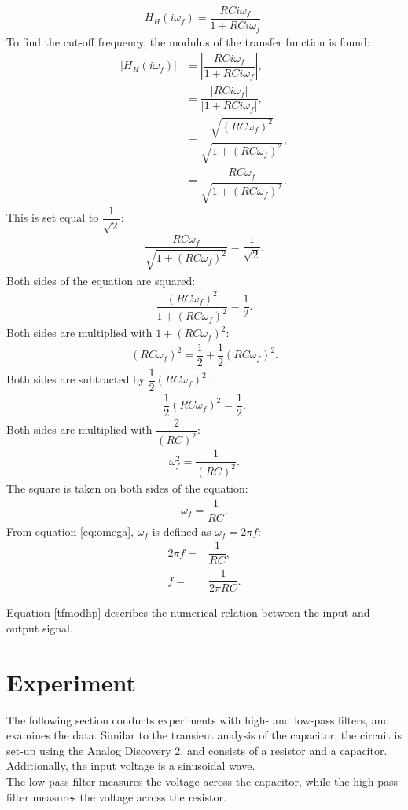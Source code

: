 \begin{align*}
H_{H}(i \omega_f) = \dfrac{RCi \omega_f}{1 + RCi \omega_f}.
\end{align*}
To find the cut-off frequency, the modulus of the transfer function is found:
\begin{align}
\left|H_{H}(i \omega_f)\right| &= \left|\dfrac{RCi \omega_f}{1 + RCi \omega_f} \right|, \nonumber \\
 &= \dfrac{|RCi \omega_f|}{|1 + RCi \omega_f |}, \nonumber \\
 &= \dfrac{\sqrt{(RC \omega_f)^2}}{\sqrt{1 + (RC \omega_f)^2 }}, \nonumber \\
 &= \dfrac{RC \omega_f}{\sqrt{1 + (RC \omega_f)^2 }}. \label{tfmodhp}
\end{align} 
This is set equal to $\dfrac{1}{\sqrt{2}}$:
\begin{align*}
\dfrac{RC \omega_f}{\sqrt{1 + (RC \omega_f)^2 }}=\dfrac{1}{\sqrt{2}}.
\end{align*}
Both sides of the equation are squared:
\begin{align*}
\dfrac{(RC \omega_f)^2}{1 + (RC \omega_f)^2 }=\dfrac{1}{2}.
\end{align*}
Both sides are multiplied with $1+(RC\omega_f)^2$:
\begin{align*}
(RC \omega_f)^2 =\dfrac{1}{2}+\dfrac{1}{2}(RC\omega_f)^2.
\end{align*}
Both sides are subtracted  by $\dfrac{1}{2}(RC\omega_f)^2$:
\begin{align*}
\dfrac{1}{2}(RC \omega_f)^2 =\dfrac{1}{2}.
\end{align*}
Both sides are multiplied with $\dfrac{2}{(RC)^2}$:
\begin{align*}
\omega_f^2 =\dfrac{1}{(RC)^2}.
\end{align*}
The square is taken on both sides of the equation:
\begin{align*}
\omega_f =\dfrac{1}{RC}.
\end{align*}
From equation \eqref{eq:omega}, $\omega_f$ is defined as $\omega_f=2 \pi f$:
\begin{align*}
2\pi f=&\dfrac{1}{RC},
\\
f=&\dfrac{1}{2\pi RC}.
\end{align*}

\noindent Equation \eqref{tfmodhp} describes the numerical relation between the input and output signal.


\section{Experiment} \label{experiment}
The following section conducts experiments with high- and low-pass filters, and examines the data. Similar to the transient analysis of the capacitor, the circuit is set-up using the Analog Discovery 2, and consists of a resistor and a capacitor. Additionally, the input voltage  is a  sinusoidal wave. \\
The low-pass filter measures the voltage across the capacitor, while the high-pass filter measures the voltage across the resistor.

